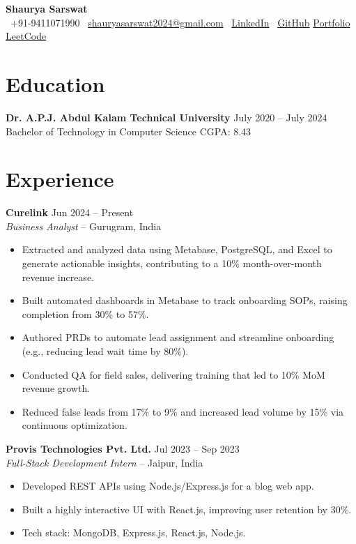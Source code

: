 \documentclass[a4paper,10pt]{article}
\begin{document}
\begin{center}
    {\LARGE \textbf{Shaurya Sarswat}}\\
    \vspace{2pt}
    \faPhone~+91-9411071990 \quad
    \faEnvelope~\href{mailto:shauryasarswat2024@gmail.com}{shauryasarswat2024@gmail.com} \quad
    \faLinkedin~\href{https://linkedin.com/in/ShauryaSarswat}{LinkedIn} \quad
    \faGithub~\href{https://github.com/ShauryaSarswat}{GitHub} \quad
    \href{https://portfolio-silk-alpha-44.vercel.app}{Portfolio} \quad
    \href{https://leetcode.com/ShauryaSarswat}{LeetCode}
\end{center}

\vspace{5pt}

\section*{Education}
\textbf{Dr. A.P.J. Abdul Kalam Technical University} \hfill July 2020 – July 2024 \\
Bachelor of Technology in Computer Science \hfill CGPA: 8.43

\section*{Experience}

\textbf{Curelink} \hfill Jun 2024 – Present \\
\textit{Business Analyst} – Gurugram, India
\begin{itemize}[left=0pt]
    \item Extracted and analyzed data using Metabase, PostgreSQL, and Excel to generate actionable insights, contributing to a 10\% month-over-month revenue increase.
    \item Built automated dashboards in Metabase to track onboarding SOPs, raising completion from 30\% to 57\%.
    \item Authored PRDs to automate lead assignment and streamline onboarding (e.g., reducing lead wait time by 80\%).
    \item Conducted QA for field sales, delivering training that led to 10\% MoM revenue growth.
    \item Reduced false leads from 17\% to 9\% and increased lead volume by 15\% via continuous optimization.
\end{itemize}

\textbf{Provis Technologies Pvt. Ltd.} \hfill Jul 2023 – Sep 2023 \\
\textit{Full-Stack Development Intern} – Jaipur, India
\begin{itemize}[left=0pt]
    \item Developed REST APIs using Node.js/Express.js for a blog web app.
    \item Built a highly interactive UI with React.js, improving user retention by 30\%.
    \item Tech stack: MongoDB, Express.js, React.js, Node.js.
\end{itemize}
\end{document}
